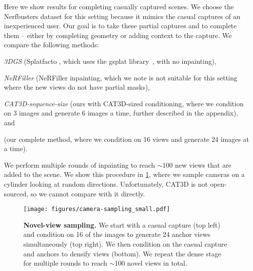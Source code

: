 %
Here we show results for completing casually captured scenes.
We choose the Nerfbusters dataset \cite{warburg2023nerfbusters} for this setting because it mimics the casual captures of an inexperienced user.
Our goal is to take these partial captures and to complete them – either by completing geometry or adding context to the capture.
We compare the following methods:
\begin{enumerate*}[(1)]
\item \textit{3DGS} (Splatfacto \cite{tancik2023nerfstudio}, which uses the gsplat library~\cite{ye2024gsplat}, with no inpainting),
\item \textit{NeRFiller} \cite{weber2024nerfiller} (NeRFiller inpainting, which we note is not suitable for this setting where the new views do not have partial masks),
\item \textit{CAT3D-sequence-size} (ours with CAT3D-sized conditioning, where we condition on 3 images and generate 6 images a time, further described in the appendix), and
\item \textit{\method} (our complete method, where we condition on 16 views and generate 24 images at a time).
\end{enumerate*}
We perform multiple rounds of inpainting to reach $\sim$100 new views that are added to the scene. We show this procedure in \cref{fig:camera_sampling}, where we sample cameras on a cylinder looking at random directions.
Unfortunately, CAT3D \cite{gao2024cat3d} is not open-sourced, so we cannot compare with it directly. 

\begin{figure}[t]
\centering
\texttt{[image: figures/camera-sampling\_small.pdf]}
\caption{\label{fig:camera_sampling}%
    \textbf{Novel-view sampling.}
    We start with a casual capture (top left) and condition on 16 of the images to generate 24 anchor views simultaneously (top right).
    We then condition on the casual capture and anchors to densify views (bottom).
    We repeat the dense stage for multiple rounds to reach $\sim$100 novel views in total.
    \vspace{-2em}
}
\end{figure}

